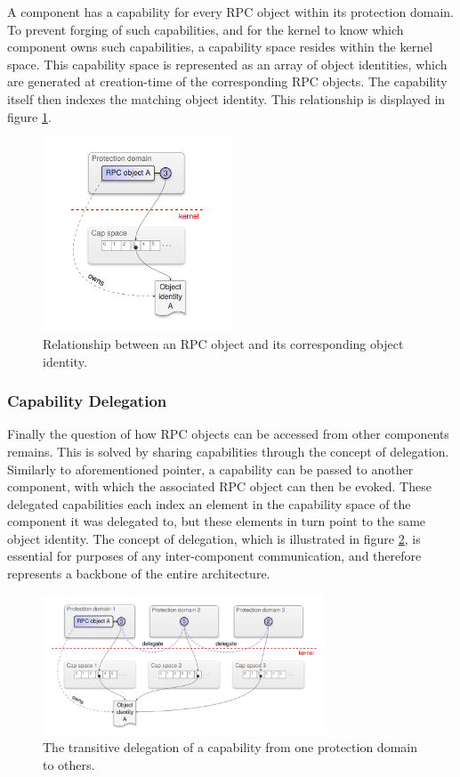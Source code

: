 A component has a capability for every RPC object within its protection domain. To prevent forging of such capabilities, and for the kernel to know which component owns such capabilities, a capability space resides within the kernel space. This capability space is represented as an array of object identities, which are generated at creation-time of the corresponding RPC objects. The capability itself then indexes the matching object identity. This relationship is displayed in figure \ref{fig:Cap_space}. \cite[P.40-41]{genode_foundations}
\begin{figure}
    \centering
    \includegraphics[width=0.5\textwidth]{Images/Cap_space.PNG}
    \caption{Relationship between an RPC object and its corresponding object identity. \cite[P.41]{genode_foundations}}
    \label{fig:Cap_space}
\end{figure}
\subsubsection{Capability Delegation}
Finally the question of how RPC objects can be accessed from other components remains. This is solved by sharing capabilities through the concept of delegation. Similarly to aforementioned pointer, a capability can be passed to another component, with which the associated RPC object can then be evoked. These delegated capabilities each index an element in the capability space of the component it was delegated to, but these elements in turn point to the same object identity. The concept of delegation, which is illustrated in figure \ref{fig:delegation}, is essential for purposes of any inter-component communication, and therefore represents a backbone of the entire architecture. \cite[P.41-42]{genode_foundations}
\begin{figure}
    \centering
    \includegraphics[width=0.75\textwidth]{Images/delegation.PNG}
    \caption{The transitive delegation of a capability from one protection domain to others. \cite[P.42]{genode_foundations}}
    \label{fig:delegation}
\end{figure}
